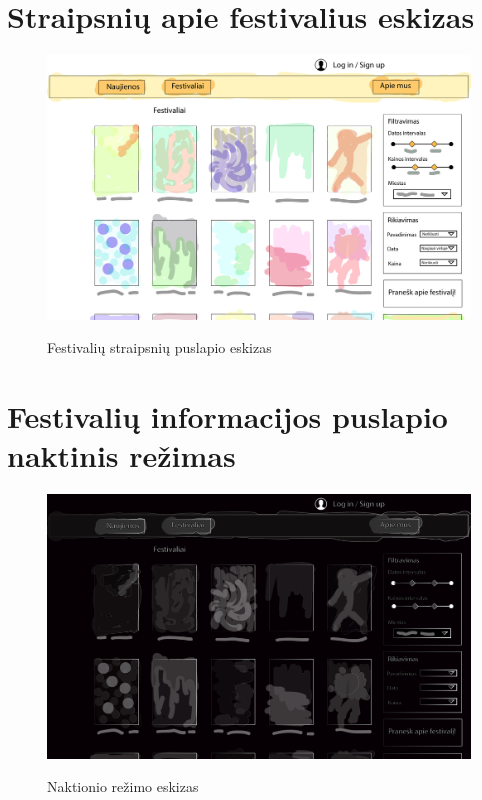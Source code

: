 \documentclass{VUMIFPSkursinis}
\begin{document}
\section{Straipsnių apie festivalius eskizas}
\begin{figure}[H]
    \centering
    \includegraphics[scale=0.35]{img/PSI2priedai/antras-01.jpg}
    \label{img:page2}
	\caption{Festivalių straipsnių puslapio eskizas}
\end{figure}

\section{Festivalių informacijos puslapio naktinis režimas}
\begin{figure}[H]
    \centering
    \includegraphics[scale=0.35]{img/PSI2priedai/blackedition.jpg}
    \label{img:page3}
	\caption{Naktionio režimo eskizas}
\end{figure}

\end{document}
